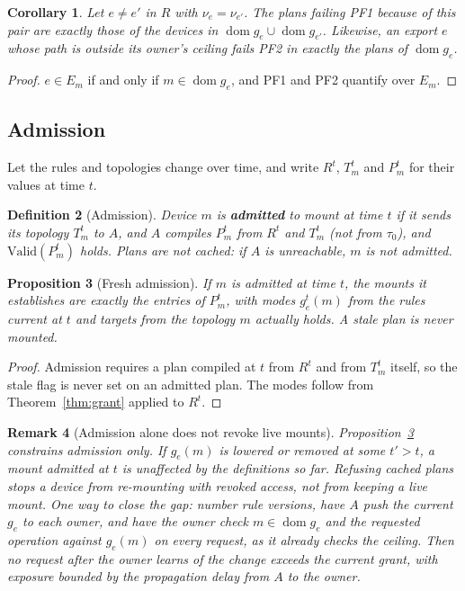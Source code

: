 \documentclass[11pt]{article}
\DeclareMathOperator{\dom}{dom}
\newcommand{\PF}[1]{\textsf{PF#1}}
\theoremstyle{definitionbreak}
\newtheorem{definition}{Definition}[section]
\theoremstyle{plainbreak}
\newtheorem{proposition}[definition]{Proposition}
\newtheorem{corollary}[definition]{Corollary}
\theoremstyle{remarkbreak}
\newtheorem{remark}[definition]{Remark}
\begin{document}
\begin{corollary}
Let $e \neq e'$ in $R$ with $\nu_e = \nu_{e'}$. The plans failing \PF{1} because of this pair
are exactly those of the devices in $\dom g_e \cup \dom g_{e'}$. Likewise, an export $e$ whose
path is outside its owner's ceiling fails \PF{2} in exactly the plans of $\dom g_e$.
\end{corollary}

\begin{proof}
$e \in E_m$ if and only if $m \in \dom g_e$, and \PF{1} and \PF{2} quantify over $E_m$.
\end{proof}

\subsection{Admission}

Let the rules and topologies change over time, and write $R^t$, $T^t_m$ and $P^t_m$ for their
values at time $t$.

\begin{definition}[Admission]
Device $m$ is \textbf{admitted} to mount at time $t$ if it sends its topology $T^t_m$ to $A$, and
$A$ compiles $P^t_m$ from $R^t$ and $T^t_m$ (not from $\tau_0$), and $\mathrm{Valid}(P^t_m)$
holds. Plans are not cached: if $A$ is unreachable, $m$ is not admitted.
\end{definition}

\begin{proposition}[Fresh admission]\label{prop:fresh}
If $m$ is admitted at time $t$, the mounts it establishes are exactly the entries of $P^t_m$,
with modes $g^t_e(m)$ from the rules current at $t$ and targets from the topology $m$ actually
holds. A stale plan is never mounted.
\end{proposition}

\begin{proof}
Admission requires a plan compiled at $t$ from $R^t$ and from $T^t_m$ itself, so the stale flag
is never set on an admitted plan. The modes follow from Theorem~\ref{thm:grant} applied to
$R^t$.
\end{proof}

\begin{remark}[Admission alone does not revoke live mounts]
Proposition~\ref{prop:fresh} constrains admission only. If $g_e(m)$ is lowered or removed at
some $t' > t$, a mount admitted at $t$ is unaffected by the definitions so far. Refusing cached
plans stops a device from \emph{re-mounting} with revoked access, not from \emph{keeping} a live
mount. One way to close the gap: number rule versions, have $A$ push the current
$g_e$ to each owner, and have the owner check $m \in \dom g_e$ and the requested operation
against $g_e(m)$ on every request, as it already checks the ceiling. Then no request after the
owner learns of the change exceeds the current grant, with exposure bounded by the propagation
delay from $A$ to the owner.
\end{remark}
\end{document}
